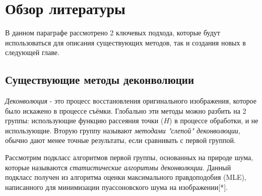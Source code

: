 \section{Обзор литературы} \label{ch1:sec2}
\par В данном параграфе рассмотрено 2 ключевых подхода, которые будут использоваться для описания существующих методов, так и создания новых в следующей главе.
\subsection{Существующие методы деконволюции} 
\par \textit{Деконволюция} - это процесс восстановления оригинального изображения, которое было искажено в процессе съёмки. Глобально эти методы можно разбить на 2 группы: использующие функцию рассеяния точки ($H$) в процессе обработки, и не использующие. Вторую группу называют \textit{методами "слепой" деконволюции}, обычно дают менее точные результаты, если сравнивать с первой группой.
\par Рассмотрим подкласс алгоритмов первой группы, основанных на природе шума, которые называются \textit{статистические алгоритмы деконволюции}. Данный подкласс получен из алгоритма оценки максимального правдоподобия (MLE), написанного для минимизации пуассоновского шума на изображении[*]. 

